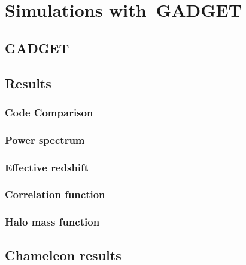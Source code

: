 \chapter{Simulations with~GADGET}

\section{GADGET}

\section{Results}

\subsection{Code Comparison}

\subsection{Power spectrum}

\subsection{Effective redshift}

\subsection{Correlation function}

\subsection{Halo mass function}

\section{Chameleon results}
